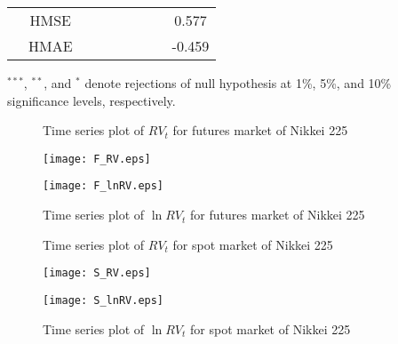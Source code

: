 \documentclass[10pt]{article}
\begin{document}
\begin{landscape}
\begin{center}
\begin{tabular}{c|c|ccccccc}
                       &  HMSE          &                    &                                &                                  &                                  &                                     &                                    &0.577             \\
                       &  HMAE          &                    &                                &                                  &                                  &                                     &                                   &-0.459             \\  \hline 
   \end{tabular}
\end{center}
$^{***}$, $^{**}$, and $^{*}$ denote rejections of null hypothesis at 1\%, 5\%, and 10\% significance levels, respectively.
\end{landscape}







\newpage
\fontsize{10pt}{10pt}\selectfont
\begin{figure}
\begin{center}
\caption{Time series plot of $RV_t$ for futures market of Nikkei 225}
   \texttt{[image: F\_RV.eps]} \\
\caption{Time series plot of $\ln RV_t$ for futures market of Nikkei 225}
   \texttt{[image: F\_lnRV.eps]} \\
\end{center}
\end{figure}

\newpage
\fontsize{10pt}{10pt}\selectfont
\begin{figure}
\begin{center}
\caption{Time series plot of $RV_t$ for spot market of Nikkei 225}
   \texttt{[image: S\_RV.eps]} \\
\caption{Time series plot of $\ln RV_t$ for spot market of Nikkei 225}
   \texttt{[image: S\_lnRV.eps]} \\
\end{center}
\end{figure}
\end{document}
